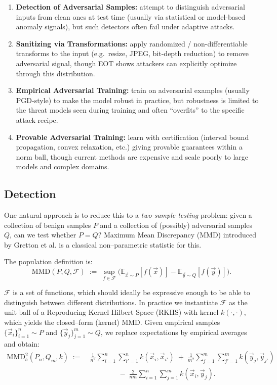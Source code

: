 \documentclass[11pt]{report}
\begin{document}
\begin{enumerate}
    \item \textbf{Detection of Adversarial Samples:} attempt to distinguish adversarial inputs from clean ones at test time (usually via statistical or model-based anomaly signals), but such detectors often fail under adaptive attacks.
    \item \textbf{Sanitizing via Transformations:} apply randomized / non-differentiable transforms to the input (e.g.\ resize, JPEG, bit-depth reduction) to remove adversarial signal, though EOT shows attackers can explicitly optimize through this distribution.
    \item \textbf{Empirical Adversarial Training:} train on adversarial examples (usually PGD-style) to make the model robust in practice, but robustness is limited to the threat models seen during training and often ``overfits'' to the specific attack recipe.
    \item \textbf{Provable Adversarial Training:} learn with certification (interval bound propagation, convex relaxation, etc.) giving provable guarantees within a norm ball, though current methods are expensive and scale poorly to large models and complex domains.
\end{enumerate}

\subsection{Detection}

One natural approach is to reduce this to a \emph{two-sample testing} problem: given a collection of benign samples $P$ and a collection of (possibly) adversarial samples $Q$, can we test whether $P=Q$?  Maximum Mean Discrepancy (MMD) introduced by Gretton et al. is a classical non–parametric statistic for this.

\medskip
\noindent The population definition is:
\begin{equation}
    \mathrm{MMD}(P,Q,\mathcal{F})
    \;:=\;
    \sup_{f\in\mathcal{F}} \Big( \mathbb{E}_{\vec{x}\sim P}[f(\vec{x})] - \mathbb{E}_{\vec{y}\sim Q}[f(\vec{y})] \Big).
\end{equation}

\noindent $\mathcal{F}$ is a set of functions, which should ideally be expressive enough to be able to distinguish between different distributions. In practice we instantiate $\mathcal{F}$ as the unit ball of a Reproducing Kernel Hilbert Space (RKHS) with kernel $k(\cdot,\cdot)$, which yields the closed–form (kernel) MMD.  Given empirical samples $\{\vec{x}_i\}_{i=1}^n\sim P$ and $\{\vec{y}_j\}_{j=1}^m\sim Q$, we replace expectations by empirical averages and obtain:
\begin{align}
    \mathrm{MMD}_b^2(P_n,Q_m,k)
    \;:=\;
    &\frac{1}{n^2}\sum_{i=1}^n \sum_{i'=1}^n k(\vec{x}_i,\vec{x}_{i'})
    \;+\;
    \frac{1}{m^2}\sum_{j=1}^m \sum_{j'=1}^m k(\vec{y}_j,\vec{y}_{j'})
    \nonumber\\
    &\qquad\qquad
    -\;
    \frac{2}{nm}\sum_{i=1}^n \sum_{j=1}^m k(\vec{x}_i,\vec{y}_j).
\end{align}
\end{document}
